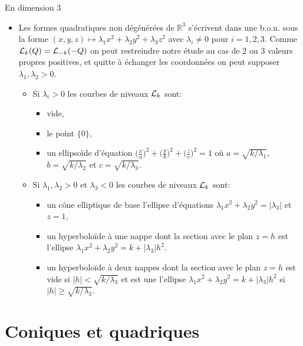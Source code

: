 \documentclass[11pt]{m53beamer}
\begin{document}
\begin{frame}{En dimension 3}
  \begin{itemize}[<+(1)->]
  \item Les formes quadratiques non dégénérées de $\mathbb{R}^{3}$ s'écrivent dans une b.o.n. sous la forme $(x,y,z)\mapsto \lambda_{1}x^{2}+\lambda_{2}y^{2}+\lambda_{3}z^{2}$ avec $\lambda_{i}\neq0$ pour $i=1,2,3$.\pause{} Comme $\mathcal{L}_{k}(Q)=\mathcal{L}_{-k}(-Q)$ on peut restreindre notre étude au cas de $2$ ou $3$ valeurs propres positives\pause, et quitte à échanger les coordonnées on peut supposer $\lambda_{1},\lambda_{2} > 0$.
    \begin{itemize}[<+(1)->]
      \item Si $\lambda_{i}>0$ les courbes de niveaux $\mathcal{L}_{k}$ sont:
      \begin{itemize}[<+(1)->]
        \item {} vide,
        \item {} le point $\{0\}$,
        \item {} un ellipsoïde d'équation $\big(\frac{x}{a}\big)^{2}+\big(\frac{y}{b}\big)^{2}+\big(\frac{z}{c}\big)^{2}=1$ où $a=\sqrt{k/\lambda_{1}}$, $b=\sqrt{k/\lambda_{2}}$ et $c=\sqrt{k/\lambda_{3}}$.
      \end{itemize}
      \item Si $\lambda_{1},\lambda_{2} > 0$ et $\lambda_{3} < 0$ les courbes de niveaux $\mathcal{L}_{k}$ sont:
      \begin{itemize}[<+(1)->]
        \item {} un cône elliptique de base l'ellipse d'équations $\lambda_{1}x^{2}+\lambda_{2}y^{2}=|\lambda_{3}|$ et $z=1$,
        \item {} un hyperboloïde à une nappe dont la section avec le plan $z=h$ est l'ellipse $\lambda_{1}x^{2}+\lambda_{2}y^{2}=k+|\lambda_{3}|h^{2}$.
        \item {} un hyperboloïde à deux nappes\pause{} dont la section avec le plan $z=h$ est vide si $|h|<\sqrt{k/\lambda_{3}}$\pause{} et est une l'ellipse $\lambda_{1}x^{2}+\lambda_{2}y^{2}=k+|\lambda_{3}|h^{2}$ si $|h|\geq\sqrt{k/\lambda_{3}}$.
      \end{itemize}
    \end{itemize}
  \end{itemize}
\end{frame}

\section{Coniques et quadriques}
\end{document}
